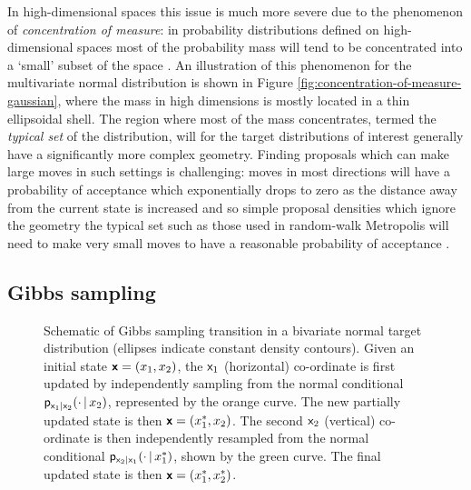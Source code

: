 In high-dimensional spaces this issue is much more severe due to the phenomenon of \emph{concentration of measure}: in probability distributions defined on high-dimensional spaces most of the probability mass will tend to be concentrated into a `small' subset of the space \citep{mackay2003information,barp2017geometry}. An illustration of this phenomenon for the multivariate normal distribution is shown in Figure \ref{fig:concentration-of-measure-gaussian}, where the mass in high dimensions is mostly located in a thin ellipsoidal shell. The region where most of the mass concentrates, termed the \emph{typical set} of the distribution, will for the target distributions of interest generally have a significantly more complex geometry. Finding proposals which can make large moves in such settings is challenging: moves in most directions will have a probability of acceptance which exponentially drops to zero as the distance away from the current state is increased and so simple proposal densities which ignore the geometry the typical set such as those used in random-walk Metropolis will need to make very small moves to have a reasonable probability of acceptance \cite{betancourt2017conceptual}.



\subsection{Gibbs sampling}

\begin{figure}[!t]
\centering
{}
\caption[Visualisation of Gibbs sampling.]{Schematic of Gibbs sampling transition in a bivariate normal target distribution (ellipses indicate constant density contours). Given an initial state $\boldsymbol{\mathsf{x}} = (x_1,x_2)$, the $\mathsf{x}_1$ (horizontal) co-ordinate is first updated by independently sampling from the normal conditional $\mathsf{p}_{\mathsf{x}_1|\mathsf{x}_2}(\cdot\operatorname{|} x_2)$, represented by the orange curve. The new partially updated state is then $\boldsymbol{\mathsf{x}} = (x_1^*, x_2)$. The second $\mathsf{x}_2$ (vertical) co-ordinate is then independently resampled from the normal conditional $\mathsf{p}_{\mathsf{x}_2|\mathsf{x}_1}(\cdot\operatorname{|} x_1^*)$, shown by the green curve. The final updated state is then $\boldsymbol{\mathsf{x}} = (x_1^*, x_2^*)$.}
\label{fig:gibbs-sampling}
\end{figure}

